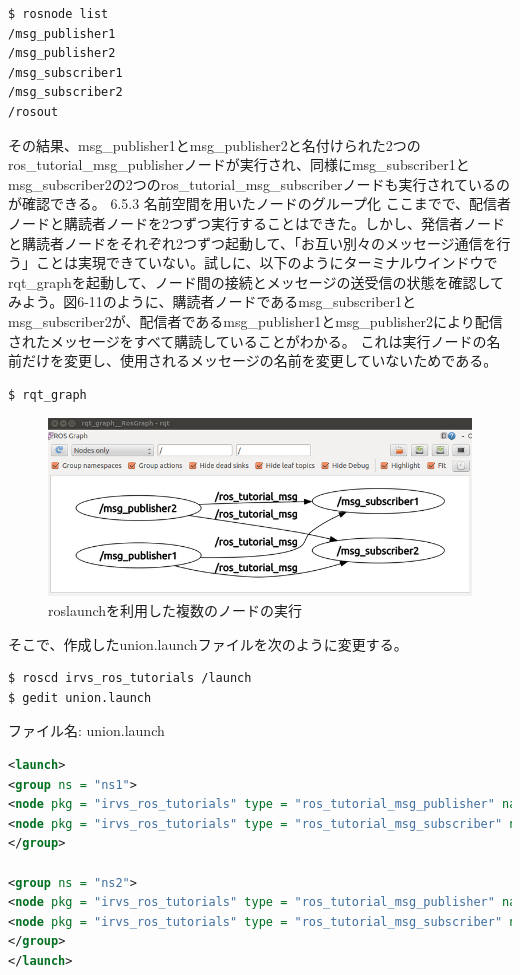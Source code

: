 \begin{lstlisting}[language=ROS]
$ rosnode list
/msg_publisher1
/msg_publisher2
/msg_subscriber1
/msg_subscriber2
/rosout
\end{lstlisting}

その結果、msg\_publisher1とmsg\_publisher2と名付けられた2つのros\_tutorial\_msg\_publisherノードが実行され、同様にmsg\_subscriber1とmsg\_subscriber2の2つのros\_tutorial\_msg\_subscriberノードも実行されているのが確認できる。
6.5.3 名前空間を用いたノードのグループ化
ここまでで、配信者ノードと購読者ノードを2つずつ実行することはできた。しかし、発信者ノードと購読者ノードをそれぞれ2つずつ起動して、「お互い別々のメッセージ通信を行う」ことは実現できていない。試しに、以下のようにターミナルウインドウでrqt\_graphを起動して、ノード間の接続とメッセージの送受信の状態を確認してみよう。図6-11のように、購読者ノードであるmsg\_subscriber1とmsg\_subscriber2が、配信者であるmsg\_publisher1とmsg\_publisher2により配信されたメッセージをすべて購読していることがわかる。 これは実行ノードの名前だけを変更し、使用されるメッセージの名前を変更していないためである。

\begin{lstlisting}[language=ROS]
$ rqt_graph
\end{lstlisting}

\begin{figure}[htp]
  \centering
  \includegraphics[width=\columnwidth]{pictures/chapter6/pic_06_11.png}
  \caption{roslaunchを利用した複数のノードの実行}
\end{figure}

そこで、作成したunion.launchファイルを次のように変更する。

\begin{lstlisting}[language=ROS]
$ roscd irvs_ros_tutorials /launch
$ gedit union.launch
\end{lstlisting}

ファイル名: union.launch
\begin{lstlisting}[language=XML]
<launch>
<group ns = "ns1">
<node pkg = "irvs_ros_tutorials" type = "ros_tutorial_msg_publisher" name = "msg_publisher" />
<node pkg = "irvs_ros_tutorials" type = "ros_tutorial_msg_subscriber" name = "msg_subscriber" />
</group>

<group ns = "ns2">
<node pkg = "irvs_ros_tutorials" type = "ros_tutorial_msg_publisher" name = "msg_publisher" />
<node pkg = "irvs_ros_tutorials" type = "ros_tutorial_msg_subscriber" name = "msg_subscriber" />
</group>
</launch>
\end{lstlisting}

